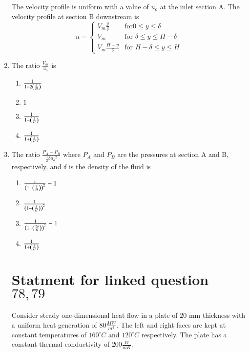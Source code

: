 \documentclass[journal,12pt,twocolumn]{IEEEtran}
\theoremstyle{remark}
\begin{document}
\begin{enumerate}[start=69]
                        The velocity profile is uniform with a value of $u_o$ at the inlet section A. The velocity profile at section B downstream is
                        $$
                        u = 
                        \begin{cases} 
                        V_m\frac{y}{\delta} & \text{for}  0 \leq y \leq \delta \\ 
                        V_m & \text{for } \delta \leq y \leq H-\delta \\ 
                        V_m\frac{H-y}{\delta} & \text{for } H-\delta \leq y \leq H 
                        \end{cases}
                        $$
                            \item The ratio $\frac{V_m}{u_o}$ is
                            \begin{enumerate}
                                \item $\frac{1}{1 - 2\left(\frac{\delta}{H}\right)}$
                                \item $1$
                                \item $\frac{1}{1 - \left(\frac{\delta}{H}\right)}$
                                \item $\frac{1}{1 + \left(\frac{\delta}{H}\right)}$
                            \end{enumerate}
                            
                            \item The ratio $\frac{P_A - P_B}{\frac{1}{2}\delta{u_o}^2}$ where $P_A$ and $P_B$ are the pressures at section A and B, respectively, and $\delta$ is the density of the fluid is
                            \begin{enumerate}
                                \item $ \frac{1}{\left(1-\left(\frac{\delta}{H}\right)\right)^2} -1$
                                \item $ \frac{1}{\left(1-\left(\frac{\delta}{H}\right)\right)^2}$
                                \item $ \frac{1}{\left(1-\left(\frac{2\delta}{H}\right)\right)^2} -1$
                                \item $ \frac{1}{1+\left(\frac{\delta}{H}\right)}$
                            \end{enumerate}
                        \section{Statment for linked question $78 ,79$}
			Consider steady one-dimensional heat flow in a plate of $20$ mm thickness with a uniform heat generation of $80 \frac{MW}{m^3}$. The left and right faces are kept at constant temperatures of $160^\circ C$ and $120^\circ C$ respectively. The plate has a constant thermal conductivity of $200 \frac{W}{mK}$. 
                        

\end{enumerate}
\end{document}
